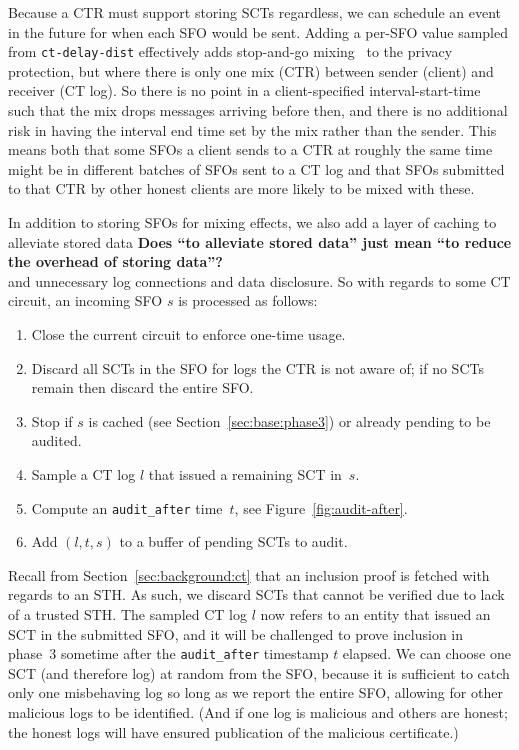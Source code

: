 Because a CTR must support storing SCTs regardless, we can schedule an event in
the future for when each SFO would be sent. Adding a per-SFO value sampled from
\texttt{ct-delay-dist} effectively adds stop-and-go
mixing~\cite{kesdogan:ih1998} to the privacy protection, but where there is only
one mix (CTR) between sender (client) and receiver (CT log). So there is no
point in a client-specified interval-start-time such that the mix drops messages
arriving before then, and there is no additional risk in having the interval end
time set by the mix rather than the sender. This means both that some SFOs a
client sends to a CTR at roughly the same time might be in different batches of
SFOs sent to a CT log and that SFOs submitted to that CTR by other honest
clients are more likely to be mixed with these.


In addition to storing SFOs for mixing effects, we also add a layer of caching
to alleviate stored data {\bf \color{red} Does ``to alleviate stored data'' just
mean ``to reduce the overhead of storing data''?}\\
and unnecessary log connections and data disclosure. So with
regards to some CT circuit, an incoming SFO $s$ is processed as follows:
\begin{enumerate}
    \item\label{enm:storage:close} Close the current circuit to enforce one-time
        usage.
    \item\label{enm:storage:unrecognized} Discard all SCTs in the SFO for logs the
        CTR is not aware of; if no SCTs remain then discard the entire SFO\@.
    \item\label{enm:storage:cached}
        Stop if $s$ is cached (see Section~\ref{sec:base:phase3}) or already
        pending to be audited.
    \item\label{enm:storage:fix-log} Sample a CT log $l$ that issued a
        remaining SCT in~$s$.
    \item\label{enm:storage:audit-after} Compute an \texttt{audit\_after}
		time~$t$, see Figure~\ref{fig:audit-after}.
    \item\label{enm:storage:store} Add $(l,t,s)$ to a buffer of pending SCTs to audit.
\end{enumerate}

Recall from Section~\ref{sec:background:ct} that an inclusion proof is fetched
with regards to an STH\@.  As such, we discard SCTs that cannot be verified due
to lack of a trusted STH\@.  The sampled CT log $l$ now refers to an entity that
issued an SCT in the submitted SFO, and it will be challenged to prove inclusion
in phase~3 sometime after the \texttt{audit\_after} timestamp $t$ elapsed. We
can choose one SCT (and therefore log) at random from the SFO, because it is
sufficient to catch only one misbehaving log so long as we report the entire
SFO, allowing for other malicious logs to be identified. (And if one log is
malicious and others are honest; the honest logs will have ensured publication
of the malicious certificate.)


